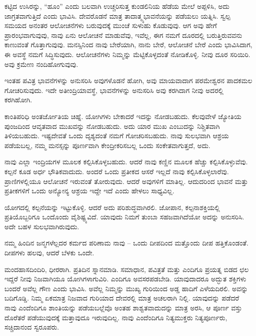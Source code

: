 \vskip 2pt

ಕಟ್ಟಿದ ಉಸಿರನ್ನು, “ಹೂಂ” ಎಂದು ಬಲವಾಗಿ ಉಚ್ಚರಿಸುತ್ತ ಕುಂಡಲಿನಿಯ ಹೆಡೆಯ ಮೇಲೆ ಅಪ್ಪಳಿಸಿ, ಅದು ಜಾಗ್ರತವಾಗುತ್ತಿದೆ ಎಂದು ಭಾವಿಸಿ. ದೇವರೊಡನೆ ಮಾತ್ರ ತಾದಾತ್ಮ್ಯಭಾವನೆಯನ್ನು ಪಡೆಯಲು ಯತ್ನಿಸಿ. ಸ್ವಲ್ಪ ಸಮಯದ ಅನಂತರ ಆಲೋಚನೆಗಳು ಬರುವುದಕ್ಕೆ ಮುಂಚೆ ಸುಳುಹು ಕೊಡುವುವು. ಆಗ ಅವು ಹೇಗೆ ಪ್ರಾರಂಭವಾಗುವುವು, ನಾವು ಏನು ಆಲೋಚನೆ ಮಾಡುವೆವು, ಇವೆಲ್ಲ, ಈಗ ನಮಗೆ ದೂರದಲ್ಲಿ ಬರುತ್ತಿರುವವನು ಕಾಣುವಂತೆ ಗೊತ್ತಾಗುವುವು. ಮನಸ್ಸಿನಿಂದ ನಾವು ಬೇರೆಯಾಗಿ, ನಾನು ಬೇರೆ, ಆಲೋಚನೆ ಬೇರೆ ಎಂದು ಭಾವಿಸಿದಾಗ, ಈ ಅವಸ್ಥೆ ನಮಗೆ ಸಿದ್ಧಿಸುವುದು. ಆಲೋಚನೆಗಳು ನಿಮ್ಮನ್ನು ಮೆಟ್ಟಿಕೊಳ್ಳದಂತೆ ನೋಡಿಕೊಳ್ಳಿ. ನೀವು ದೂರ ಸರಿಯಿರಿ. ಅವು ಕ್ರಮೇಣ ನಂದಿಹೋಗುವುವು.

\vskip 2pt

ಇಂತಹ ಪವಿತ್ರ ಭಾವನೆಗಳನ್ನು ಅನುಸರಿಸಿ ಅವುಗಳೊಡನೆ ಹೋಗಿ, ಅವು ಮಾಯವಾದಾಗ ಪರಮೇಶ್ವರನ ಪಾದಕಮಲ ಗೋಚರಿಸುವುದು. ಇದೇ ಅತೀಂದ್ರಿಯಾವಸ್ಥೆ, ಭಾವನೆಗಳನ್ನು ಅನುಸರಿಸಿ ಅವು ಕರಗಿದಾಗ ನೀವು ಅದರಲ್ಲಿ ಕರಗಿಹೋಗಿ.

\vskip 2pt

ಕಾಂತಿಪರಿಧಿ ಅಂತರ್ಜೋತಿಯ ಚಿಹ್ನೆ. ಯೋಗಿಗಳು ಬೇಕಾದರೆ ಇದನ್ನು ನೋಡಬಹುದು. ಕೆಲವುವೇಳೆ ಜ್ಯೋತಿಯ ಪುಂಜದಿಂದ ಆವೃತವಾದ ಮುಖವನ್ನು ನೋಡಬಹುದು. ಅದು ಯಾರ ಮುಖ ಎಂಬುದನ್ನು ನಿಶ್ಚಿತವಾಗಿ ತಿಳಿಯಬಹುದು. ಇಷ್ಟದೇವತೆ ಒಂದು ದೃಶ್ಯದಂತೆ ನಮಗೆ ಗೋಚರಿಸಬಹುದು. ನಾವು ಸುಲಭವಾಗಿ ಆಶ್ರಯ ಪಡೆಯಬಲ್ಲ, ನಮ್ಮ ಮನಸ್ಸನ್ನು ಪೂರ್ಣವಾಗಿ ಕೇಂದ್ರೀಕರಿಸಬಲ್ಲ ಒಂದು ಸಂಕೇತವಾಗುತ್ತದೆ, ಅದು.

\vskip 2pt

ನಾವು ಎಲ್ಲಾ ಇಂದ್ರಿಯಗಳ ಮೂಲಕ ಕಲ್ಪಿಸಿಕೊಳ್ಳಬಹುದು. ಆದರೆ ನಾವು ಕಣ್ಣಿನ ಮೂಲಕ ಹೆಚ್ಚು ಕಲ್ಪಿಸಿಕೊಳ್ಳುವೆವು. ಕಲ್ಪನೆ ಕೂಡ ಅರ್ಧ ಭೌತಿಕವಾದುದು. ಅಂದರೆ ಒಂದು ಪ್ರತೀಕದ ಆಸರೆ ಇಲ್ಲದೆ ನಾವು ಕಲ್ಪಿಸಿಕೊಳ್ಳಲಾರೆವು. ಪ್ರಾಣಿಗಳಲ್ಲಿಯೂ ಆಲೋಚನೆ ಇರುವಂತೆ ತೋರುವುದು. ಆದರೆ ಅವುಗಳಿಗೆ ಮಾತಿಲ್ಲ. ಆದುದರಿಂದ ಭಾವನೆ ಮತ್ತು ಪ್ರತೀಕಗಳಿಗೆ ಒಂದು ಅನ್ಯೋನ್ಯ ಆಶ್ರಯ ಇದ್ದೇ ಇದೆ ಎಂದು ಹೇಳಲು ಸಾಧ್ಯವಿಲ್ಲ.

\vskip 2pt

ಯೋಗದಲ್ಲಿ ಕಲ್ಪನೆಯನ್ನು ಇಟ್ಟುಕೊಳ್ಳಿ. ಆದರೆ ಅದು ಪರಿಶುದ್ಧವಾಗಿರಲಿ. ಜೋಪಾನ, ಕಲ್ಪನಾಶಕ್ತಿಯಲ್ಲಿ ಪ್ರತಿಯೊಬ್ಬರಿಗೂ ಒಂದೊಂದು ವೈಶಿಷ್ಟ್ಯವಿದೆ. ಯಾವುದು ನಿಮಗೆ ತುಂಬಾ ಸಹಜವಾಗಿದೆಯೋ ಅದನ್ನು ಅನುಸರಿಸಿ. ಅದೇ ಬಹಳ ಸುಲಭವಾಗಿರುವುದು.

\vskip 2pt

ನಮ್ಮ ಹಿಂದಿನ ಜನ್ಮಗಳೆಲ್ಲದರ ಕರ್ಮದ ಪರಿಣಾಮ ನಾವು – ಒಂದು ದೀಪದಿಂದ ಮತ್ತೊಂದು ದೀಪ ಹತ್ತಿಕೊಂಡಂತೆ. ದೀಪಗಳು ಹಲವು, ಆದರೆ ಬೆಳಕು ಒಂದೇ.

\vskip 2pt

ಮಂದಹಾಸದಿಂದಿರಿ, ಧೀರರಾಗಿ. ಪ್ರತಿದಿನ ಸ್ನಾನಮಾಡಿ. ಸಮಾಧಾನ, ಪವಿತ್ರತೆ ಮತ್ತು ಎಂದಿಗೂ ಪ್ರಯತ್ನ ಬಿಡದ ಛಲ ಇದ್ದರೆ ನೀವು ನಿಜವಾಗಿಯೂ ಯೋಗಿಗಳಾಗುವಿರಿ. ಎಂದಿಗೂ ಅವಸರಪಡಬೇಡಿ. ಯಾವುದಾದರೂ ಅದ್ಭುತ ಶಕ್ತಿಗಳು ಬಂದರೆ ಅವೆಲ್ಲ ಗೌಣ ಎಂದು ಭಾವಿಸಿ. ಅವೆಲ್ಲ ನಿಮ್ಮನ್ನು ಮುಖ್ಯ ಗುರಿಯಿಂದ ಅಡ್ಡ ಹಾದಿಗೆ ಎಳೆಯದಿರಲಿ. ಅವನ್ನು ಬದಿಗೊಡ್ಡಿ. ನಿಮ್ಮ ಏಕಮಾತ್ರ ನಿಜವಾದ ಗುರಿಯಾದ ದೇವರಲ್ಲಿ ಮಾತ್ರ ಅಚಲರಾಗಿ ನಿಲ್ಲಿ. ಯಾವುದನ್ನು ಪಡೆದರೆ ನಾವು ಎಂದೆಂದಿಗೂ ಶಾಂತಿಯನ್ನು ಪಡೆಯಬಲ್ಲೆವೊ ಅಂತಹ ಶಾಶ್ವತವಾದುದನ್ನು ಮಾತ್ರ ಅರಸಿ, ಆ ಪೂರ್ಣ ವಸ್ತು ದೊರೆತರೆ ಪಡೆಯುವುದಕ್ಕೆ ಮತ್ತಾವುದೂ ಇರುವುದಿಲ್ಲ. ನಾವು ಎಂದೆಂದಿಗೂ ನಿತ್ಯಮುಕ್ತರು ನಿತ್ಯಪೂರ್ಣರು, ಸಚ್ಚಿದಾನಂದ ಸ್ವರೂಪರು.


